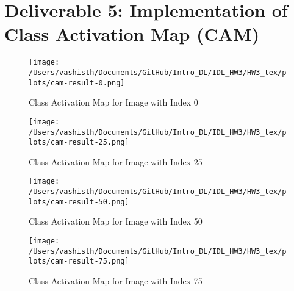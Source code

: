 
\section{Deliverable 5: Implementation of Class Activation Map (CAM)}


\begin{solve}

    \begin{figure}[H]
        \centering
        \texttt{[image: /Users/vashisth/Documents/GitHub/Intro\_DL/IDL\_HW3/HW3\_tex/plots/cam-result-0.png]}
        \caption{Class Activation Map for Image with Index 0}
        \centering
        \texttt{[image: /Users/vashisth/Documents/GitHub/Intro\_DL/IDL\_HW3/HW3\_tex/plots/cam-result-25.png]}
        \caption{Class Activation Map for Image with Index 25}
    \end{figure}

    \begin{figure}[H]
        \centering
        \texttt{[image: /Users/vashisth/Documents/GitHub/Intro\_DL/IDL\_HW3/HW3\_tex/plots/cam-result-50.png]}
        \caption{Class Activation Map for Image with Index 50}
        \centering
        \texttt{[image: /Users/vashisth/Documents/GitHub/Intro\_DL/IDL\_HW3/HW3\_tex/plots/cam-result-75.png]}
        \caption{Class Activation Map for Image with Index 75}
    \end{figure}
\end{solve}
